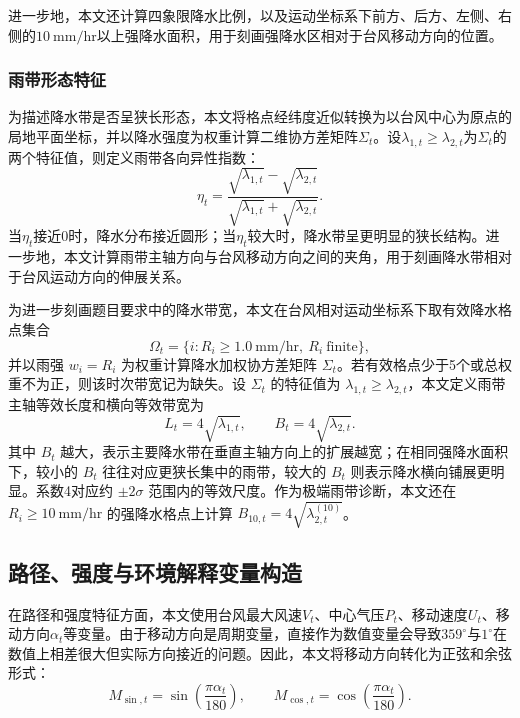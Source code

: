 \documentclass[UTF8,a4paper,zihao=5,fontset=fandol]{ctexart}
\numberwithin{equation}{section}
\numberwithin{figure}{section}
\numberwithin{table}{section}
\begin{document}
进一步地，本文还计算四象限降水比例，以及运动坐标系下前方、后方、左侧、右侧的$10\ \mathrm{mm/hr}$以上强降水面积，用于刻画强降水区相对于台风移动方向的位置。

\subsubsection{雨带形态特征}

为描述降水带是否呈狭长形态，本文将格点经纬度近似转换为以台风中心为原点的局地平面坐标，并以降水强度为权重计算二维协方差矩阵$\Sigma_t$。设$\lambda_{1,t}\geq\lambda_{2,t}$为$\Sigma_t$的两个特征值，则定义雨带各向异性指数：
\begin{equation}
    \eta_t=\frac{\sqrt{\lambda_{1,t}}-\sqrt{\lambda_{2,t}}}
    {\sqrt{\lambda_{1,t}}+\sqrt{\lambda_{2,t}}}.
\end{equation}
当$\eta_t$接近0时，降水分布接近圆形；当$\eta_t$较大时，降水带呈更明显的狭长结构。进一步地，本文计算雨带主轴方向与台风移动方向之间的夹角，用于刻画降水带相对于台风运动方向的伸展关系。

为进一步刻画题目要求中的降水带宽，本文在台风相对运动坐标系下取有效降水格点集合
\[
    \Omega_t=\{i:R_i\geq 1.0\ \mathrm{mm/hr},\ R_i\ \mathrm{finite}\},
\]
并以雨强 $w_i=R_i$ 为权重计算降水加权协方差矩阵 $\Sigma_t$。若有效格点少于5个或总权重不为正，则该时次带宽记为缺失。设 $\Sigma_t$ 的特征值为 $\lambda_{1,t}\geq\lambda_{2,t}$，本文定义雨带主轴等效长度和横向等效带宽为
\[
    L_t=4\sqrt{\lambda_{1,t}},\qquad
    B_t=4\sqrt{\lambda_{2,t}}.
\]
其中 $B_t$ 越大，表示主要降水带在垂直主轴方向上的扩展越宽；在相同强降水面积下，较小的 $B_t$ 往往对应更狭长集中的雨带，较大的 $B_t$ 则表示降水横向铺展更明显。系数4对应约 $\pm2\sigma$ 范围内的等效尺度。作为极端雨带诊断，本文还在 $R_i\geq10\ \mathrm{mm/hr}$ 的强降水格点上计算 $B_{10,t}=4\sqrt{\lambda_{2,t}^{(10)}}$。

\subsection{路径、强度与环境解释变量构造}

在路径和强度特征方面，本文使用台风最大风速$V_t$、中心气压$P_t$、移动速度$U_t$、移动方向$\alpha_t$等变量。由于移动方向是周期变量，直接作为数值变量会导致$359^\circ$与$1^\circ$在数值上相差很大但实际方向接近的问题。因此，本文将移动方向转化为正弦和余弦形式：
\begin{equation}
    M_{\sin,t}=\sin\left(\frac{\pi\alpha_t}{180}\right),\qquad
    M_{\cos,t}=\cos\left(\frac{\pi\alpha_t}{180}\right).
\end{equation}
\end{document}
